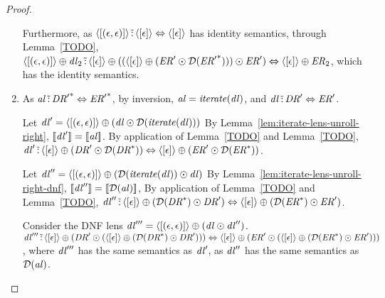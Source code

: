 \documentclass[numbers,10pt,preprint\ifanon ,nocopyrightspace\fi]{sigplanconf}
\begin{document}
\begin{proof}
\begin{case}[\AtomUnrollstarLeftRule{},\AtomUnrollstarRightRule{}]
\begin{enumerate}
      Furthermore, as $\langle[(\epsilon,\epsilon)]\rangle
      \,\tilde{:}\, \langle[\epsilon]\rangle \Leftrightarrow
      \langle[\epsilon]\rangle$ has identity semantics, through
      Lemma~\ref{TODO},
      $\langle[(\epsilon,\epsilon)]\rangle \oplus
      \mathit{dl}_2 \,\tilde{:}\, \langle[\epsilon]\rangle \oplus
      ((\langle[\epsilon]\rangle \oplus
      (\mathit{ER}'
      \odot \mathcal{D}({\mathit{ER}'}^*))) \odot
      \mathit{ER}') \Leftrightarrow
      \langle[\epsilon]\rangle
      \oplus \mathit{ER}_2$, which has the identity semantics.
    \item
      As $\mathit{al} \,\tilde{:}\, {\mathit{DR}'}^* \Leftrightarrow
      {\ensuremath{\mathit{ER}}'}^*$, by inversion,
      $\mathit{al} = \mathit{\mathit{iterate}(\mathit{dl})}$, and
      $\mathit{dl} \,\tilde{:}\, \mathit{DR}' \Leftrightarrow \mathit{ER}'$.
      
      Let $\mathit{dl}' = \langle[(\epsilon,\epsilon)]\rangle
      \oplus (\mathit{dl} \odot \mathcal{D}(\mathit{\mathit{iterate}(\mathit{dl})}))$
      By Lemma~\ref{lem:iterate-lens-unroll-right},
      $[ \! [\mathit{dl}'] \! ] = [ \! [\mathit{al}] \! ]$.
      By application of Lemma~\ref{TODO} and Lemma~\ref{TODO},
      $\mathit{dl}' \,\tilde{:}\, \langle[\epsilon]\rangle \oplus
      (\mathit{DR}' \odot \mathcal{D}({\mathit{DR}}^*)) \Leftrightarrow
      \langle[\epsilon]\rangle \oplus
      (\mathit{ER}' \odot \mathcal{D}({\mathit{ER}}^*))$.
      
      Let $\mathit{dl}'' = \langle[(\epsilon,\epsilon)]\rangle
      \oplus (\mathcal{D}(\mathit{\mathit{iterate}(\mathit{dl})})
      \odot \mathit{dl})$
      By Lemma~\ref{lem:iterate-lens-unroll-right-dnf},
      $[ \! [\mathit{dl}''] \! ] =
      [ \! [\mathcal{D}(\mathit{al})] \! ]$,
      By application of Lemma~\ref{TODO} and Lemma~\ref{TODO},
      $\mathit{dl}'' \,\tilde{:}\, \langle[\epsilon]\rangle \oplus
      (\mathcal{D}({\mathit{DR}}^*) \odot \mathit{DR}') \Leftrightarrow
      \langle[\epsilon]\rangle \oplus
      (\mathcal{D}({\mathit{ER}}^*) \odot \mathit{ER}')$.

      Consider the DNF lens
      $\mathit{dl}''' = \langle[(\epsilon,\epsilon)]\rangle
      \oplus (\mathit{dl} \odot \mathit{dl}'')$.
      $\mathit{dl}''' \,\tilde{:}\,
      \langle[\epsilon]\rangle \oplus
      (\mathit{DR}' \odot (\langle[\epsilon]\rangle \oplus
      (\mathcal{D}({\mathit{DR}}^*) \odot \mathit{DR}'))) \Leftrightarrow
      \langle[\epsilon]\rangle \oplus
      (\mathit{ER}' \odot (\langle[\epsilon]\rangle \oplus
      (\mathcal{D}({\mathit{ER}}^*) \odot \mathit{ER}')))$,
      where $\mathit{dl}'''$ has the same semantics as $\mathit{dl}'$, as
      $\mathit{dl}''$ has the same semantics as $\mathcal{D}(\mathit{al})$.


\end{enumerate}
\end{case}
\end{proof}
\end{document}
